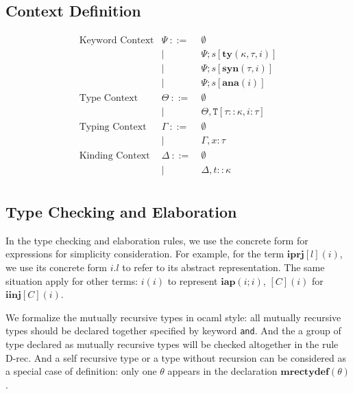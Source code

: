 \documentclass[letterpaper, notitlepage]{article}
\newcommand{\flyingbox}[1]{\begin{flushleft}\fbox{{#1}}\end{flushleft}}
\newcommand{\T}{\mathtt{T}}
\begin{document}
\subsection{Context Definition}
\[
\begin{array}{rrl}
\text{Keyword Context}	&	\Psi 	~::=&~ 	\emptyset\\
						&			| ~ &~ 	\Psi;s[\mathbf{ty}(\kappa,\tau,i)]\\
						&			| ~ &~ 	\Psi;s[\mathbf{syn}(\tau,i)]\\
						&			| ~ &~ 	\Psi;s[\mathbf{ana}(i)]\\
\text{Type Context}		&	\Theta 	~::=&~ \emptyset\\
						&			| ~ &~ \Theta,\T[\tau::\kappa,i:\tau] \\
\text{Typing Context}	&	\Gamma 	~::=&~ \emptyset\\
						&			| ~ &~ \Gamma,x:\tau\\
\text{Kinding Context}	& 	\Delta	~::=&~ \emptyset\\
						& 			| ~ &~ \Delta,t::\kappa\\
\end{array}
\]

\subsection{Type Checking and Elaboration}
In the type checking and elaboration rules, we use the concrete form for expressions for simplicity consideration. For example, for the term $\mathbf{iprj}[l](i)$, we use its concrete form $i.l$ to refer to its abstract representation. The same situation apply for other terms: $i(i)$ to represent $\mathbf{iap}(i;i)$, $[C](i)$ for $\mathbf{iinj}[C](i)$.

We formalize the mutually recursive types in ocaml style: all mutually recursive types should be declared together specified by keyword \verb|and|. And the a group of type declared as mutually recursive types will be checked altogether in the rule D-rec. And a self recursive type or a type without recursion can be considered as a special case of definition: only one $\theta$ appears in the declaration $\mathbf{mrectydef}(\theta)$.

\flyingbox{$\rho \sim (\Psi;\Theta)\rightsquigarrow i:\tau$}
\begin{center}
      
\DP
\end{center}
\end{document}
